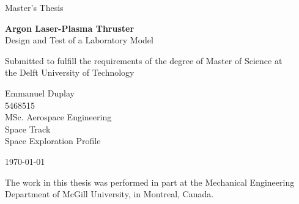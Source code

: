 \begin{titlepage}
    \thispagestyle{empty}
    \sffamily
    \vspace*{3cm}
    {\large \color{cyan}
        Master's Thesis
    }

    \vspace{0.3cm}
    {\LARGE \textbf{Argon Laser-Plasma Thruster}}\\
    {\Large Design and Test of a Laboratory Model}

    \vspace{0.2cm}
    {\large 
        Submitted to fulfill the requirements of the degree of Master of Science at\\the Delft University of Technology

        \vspace{1cm}
        Emmanuel Duplay\\
        5468515 \\
        MSc. Aerospace Engineering \\
        Space Track \\
        Space Exploration Profile

        \vspace{0.5cm}
        \today
    }
    \vfill
    {   
        The work in this thesis was performed in part at the Mechanical Engineering Department of McGill University, in Montreal, Canada.
        
}
\end{titlepage}
